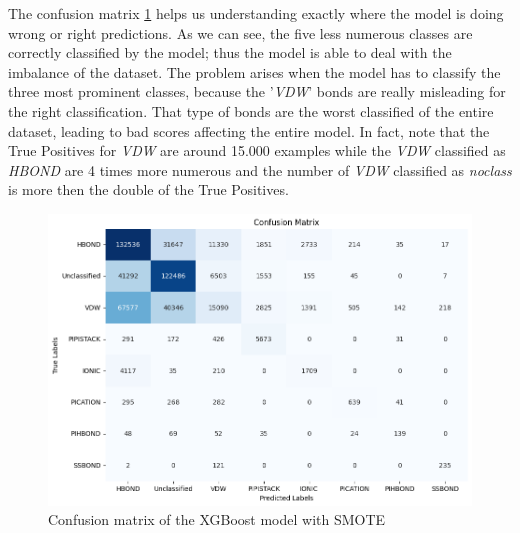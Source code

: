 \documentclass[10pt,twocolumn,letterpaper]{article}
\begin{document}
The confusion matrix \ref{fig:cmXGBoostSMOTE} helps us understanding exactly where the model is doing wrong or right 
predictions. As we can see, the five less numerous classes are correctly classified by the model; thus the model is able 
to deal with the imbalance of the dataset. The problem arises when the model has to classify the three most prominent 
classes, because the '\textit{VDW}' bonds are really misleading for the right classification. 
That type of bonds are the worst classified of the entire dataset, leading to bad scores affecting the entire model. 
In fact, note that the True Positives for \textit{VDW} are around 15.000 examples while the \textit{VDW} classified as \textit{HBOND} are 4 times more numerous and the number of \textit{VDW} classified as \textit{noclass} 
is more then the double of the True Positives.
\begin{center}
    \begin{figure}[h!]
        \centering
        \includegraphics[scale=0.35]{img/cmXGBoostSMOTE.png}
        \caption{Confusion matrix of the XGBoost model with SMOTE}
        \label{fig:cmXGBoostSMOTE}
    \end{figure}
\end{center}
\end{document}

